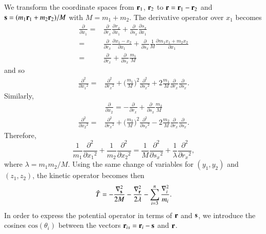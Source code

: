 \documentclass[aip,jcp,reprint,noshowkeys,superscriptaddress]{revtex4-1}
\newcommand{\deriv}[3]{\frac{\partial^{#3} #1}{\partial {#2}^{#3}}}
\newcommand{\bd}[1]{{\bf {#1}}}
\newcommand{\br}[0]{{\bf {r}}}
\newcommand{\bs}[0]{{\bf {s}}}
\begin{document}
We transform the coordinate spaces from $\bd{r}_1$, $\bd{r}_2$ to $\br = \bd{r}_1 - \bd{r}_2$ and $\bs = (m_1 \bd{r}_1 + m_2 \bd{r}_2)/M$ with $M=m_1+m_2$. 
The derivative operator over $x_1$ becomes
\begin{equation}
 \begin{aligned}
 \deriv{}{x_1}{} = & \deriv{}{r_x}{} \deriv{r_x}{x_1}{} + \deriv{}{s_x}{} \deriv{s_x}{x_1}{} \\
                 = & \deriv{}{r_x}{} \deriv{x_1 - x_2}{x_1}{} + \deriv{}{s_x}{} \frac{1}{M}\deriv{m_1 x_1 + m_2 x_2}{x_1}{} \\
                 = & \deriv{}{r_x}{}                          + \deriv{}{s_x}{} \frac{m_1}{M}
 \end{aligned}
\end{equation}
and so
\begin{equation}
 \begin{aligned}
  \deriv{}{x_1}{2} = & \deriv{}{r_x}{2} + \bigg(\frac{m_1}{M} \bigg)^2 \deriv{}{s_x}{2} + 2\frac{m_1}{M}  \deriv{}{r_x}{}\deriv{}{s_x}{}.
 \end{aligned}
\end{equation}
Similarly, 
\begin{equation}
 \begin{aligned}
 \deriv{}{x_2}{} = - \deriv{}{r_x}{}    + \deriv{}{s_x}{} \frac{m_2}{M}
 \end{aligned}
\end{equation}
\begin{equation}
 \begin{aligned}
  \deriv{}{x_2}{2} = & \deriv{}{r_x}{2} + \bigg(\frac{m_2}{M} \bigg)^2 \deriv{}{s_x}{2} - 2\frac{m_2}{M}  \deriv{}{r_x}{}\deriv{}{s_x}{}.
 \end{aligned}
\end{equation}
Therefore, 
\begin{equation}
 \frac{1}{m_1} \deriv{}{x_1}{2}  + \frac{1}{m_2} \deriv{}{x_2}{2} = \frac{1}{M} \deriv{}{s_x}{2} + \frac{1}{\lambda} \deriv{}{r_x}{2}, 
\end{equation}
where $\lambda = m_1 m_2/M$.
Using the same change of variables for $(y_1,y_2)$ and $(z_1,z_2)$, the kinetic operator becomes then 
\begin{equation}
 \hat{T} = -\frac{\nabla^2_{\bs}}{2M} -\frac{\nabla^2_{\br}}{2\lambda} - \sum_{i=3}^n \frac{\nabla_i^2}{m_i}.
\end{equation}
In order to express the potential operator in terms of $\br$ and $\bs$, we introduce the cosines $\text{cos}(\theta_i)$ between the vectors $\bd{r}_{is} = \bd{r}_i - \bs$ and $\br$. 
\end{document}

